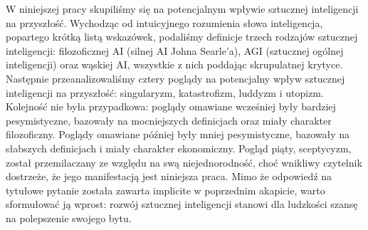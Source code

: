 \documentclass[10pt,a4paper]{article}
\begin{document}
	\par W niniejszej pracy skupiliśmy się na potencjalnym wpływie sztucznej inteligencji na przyszłość. Wychodząc od intuicyjnego rozumienia słowa inteligencja, popartego krótką listą wskazówek, podaliśmy definicje trzech rodzajów sztucznej inteligencji: filozoficznej AI (silnej AI Johna Searle'a), AGI (sztucznej ogólnej inteligencji) oraz wąskiej AI, wszystkie z nich poddając skrupulatnej krytyce. Następnie przeanalizowaliśmy cztery poglądy na potencjalny wpływ sztucznej inteligencji na przyszłość: singularyzm, katastrofizm, luddyzm i utopizm. Kolejność nie była przypadkowa: poglądy omawiane wcześniej były bardziej pesymistyczne, bazowały na mocniejszych definicjach oraz miały charakter filozoficzny. Poglądy omawiane później były mniej pesymistyczne, bazowały na słabszych definicjach i miały charakter ekonomiczny. Pogląd piąty, sceptycyzm, został przemilaczany ze względu na swą niejednorodność, choć wnikliwy czytelnik dostrzeże, że jego manifestacją jest niniejsza praca. Mimo że odpowiedź na tytułowe pytanie została zawarta implicite w poprzednim akapicie, warto sformułować ją wprost: rozwój sztucznej inteligencji stanowi dla ludzkości szansę na polepszenie swojego bytu.
\end{document}
